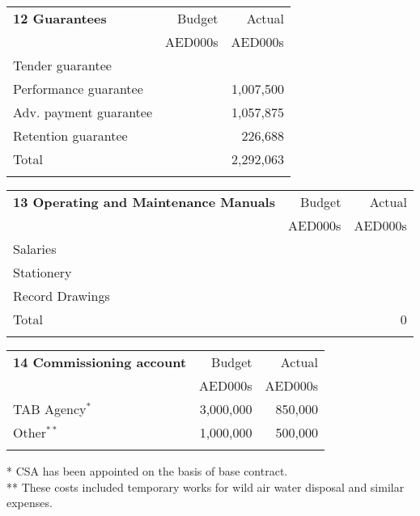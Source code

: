 \documentclass[oneside]{scrbook}
\begin{document}
\vspace*{1.8cm}
\begin{tabularx}{\linewidth}{Xrr}
\textbf{12 Guarantees}                                            &Budget   &Actual\\
                                                                               &AED000s &AED000s\\
 \noalign{\DotRow{}{}} 
 Tender guarantee  & &\\
 Performance guarantee &&1,007,500\\
 Adv. payment guarantee &&1,057,875\\
 Retention guarantee &&226,688\\
\noalign{\DotRow{}{}} 
Total   										&     &2,292,063 \\
\noalign{\DotRow{}{}} 
\end{tabularx}  
\bigskip\bigskip

\begin{tabularx}{\linewidth}{Xrr}
\textbf{13 Operating and Maintenance Manuals }                                            &Budget   &Actual\\
                                                                               &AED000s &AED000s\\
\noalign{\DotRow{}{}} 
Salaries  &&\\
Stationery &&\\
Record Drawings &&\\
\noalign{\DotRow{}{}} 
Total   										&     &0 \\
\noalign{\DotRow{}{}} 
\end{tabularx}  
\bigskip\bigskip




\leavevmode
\noindent
\begin{tabularx}{\textwidth}{@{}Xrr@{}}
\textbf{14 Commissioning account}                                     &Budget   &Actual\\
                                                                                          &AED000s &AED000s\\
\noalign{\DotRow{}{}}                
TAB Agency$^*$												&3,000,000 & 850,000\\
Other$^{**}$                                                                                 &1,000,000 & 500,000\\
\noalign{\DotRow{}{}}  
\end{tabularx}

{\small
*  CSA has been appointed on the basis of base contract.\\
** These costs included temporary works for wild air water disposal and similar expenses.\\
}
\vspace*{1cm}
\end{document}

